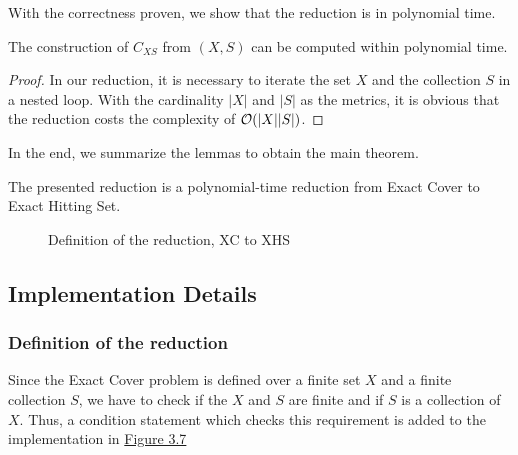 With the correctness proven, we show that the reduction is in polynomial time. 
\begin{lemma}
    The construction of $C_{XS}$ from $(X, S)$ can be computed within polynomial time. 
\end{lemma}
\begin{proof}
    In our reduction, it is necessary to iterate the set $X$ and the collection $S$ in a nested loop. 
With the cardinality $|X|$ and $|S|$ as the metrics, it is obvious that the reduction costs the complexity of $\mathcal{O}({|X||S|})$.
\end{proof}
In the end, we summarize the lemmas to obtain the main theorem.
\begin{theorem}
    The presented reduction is a polynomial-time reduction from Exact Cover to Exact Hitting Set.
\end{theorem}

\begin{figure}[!ht]
    \caption{Definition of the reduction, XC to XHS}
    \label{fig:8}
\end{figure}

\subsection{Implementation Details}
\subsubsection{Definition of the reduction}
Since the Exact Cover problem is defined over a finite set $X$ and a finite collection $S$, we have to check if the $X$ and $S$ are finite and 
if $S$ is a collection of $X$. Thus, a condition statement which checks this requirement is added to the implementation in \hyperref[fig:8]{Figure 3.7}
